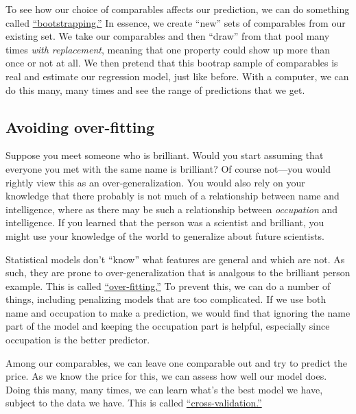 \documentclass[
12pt, %
letterpaper, %
oneside, %
headinclude,footinclude, %
BCOR5mm, %
]{scrartcl}
\begin{document}
To see how our choice of comparables affects our prediction, we can do something called \href{https://en.wikipedia.org/wiki/Bootstrapping_(statistics)}{``bootstrapping.''}
In essence, we create ``new'' sets of comparables from our existing set.
We take our comparables and then ``draw'' from that pool many times \emph{with replacement}, meaning that one property could show up more than once or not at all.
We then pretend that this bootrap sample of comparables is real and estimate our regression model, just like before.
With a computer, we can do this many, many times and see the range of predictions that we get. 

\subsection{Avoiding over-fitting} \label{sec:regularization}
Suppose you meet someone who is brilliant.
Would you start assuming that everyone you met with the same name is brilliant?
Of course not---you would rightly view this as an over-generalization.
You would also rely on your knowledge that there probably is not much of a relationship between name and intelligence, where as there may be such a relationship between \textit{occupation} and intelligence.
If you learned that the person was a scientist and brilliant, you might use your knowledge of the world to generalize about future scientists.

Statistical models don't ``know'' what features are general and which are not.
As such, they are prone to over-generalization that is analgous to the brilliant person example. 
This is called \href{https://en.wikipedia.org/wiki/Overfitting}{``over-fitting.''}
To prevent this, we can do a number of things, including penalizing models that are too complicated.
If we use both name and occupation to make a prediction, we would find that ignoring the name part of the model and keeping the occupation part is helpful, especially since occupation is the better predictor. 

Among our comparables, we can leave one comparable out and try to predict the price.
As we know the price for this, we can assess how well our model does.
Doing this many, many times, we can learn what's the best model we have, subject to the data we have.
This is called \href{https://en.wikipedia.org/wiki/Cross-validation_(statistics)}{``cross-validation.''}

\end{document}
